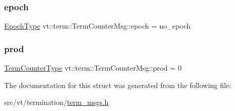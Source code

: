 \mbox{\label{structvt_1_1term_1_1_term_counter_msg_af523f9872306ba8ad1c4ad49694b3ee8}} 
\subsubsection{\texorpdfstring{epoch}{epoch}}
{\footnotesize\ttfamily \hyperlink{namespacevt_a81d11b28122d43bf9834577e4a06440f}{Epoch\+Type} vt\+::term\+::\+Term\+Counter\+Msg\+::epoch = no\+\_\+epoch}

\mbox{\label{structvt_1_1term_1_1_term_counter_msg_a4fd3f09a9e5a54865abbd76a95ea7067}} 
\subsubsection{\texorpdfstring{prod}{prod}}
{\footnotesize\ttfamily \hyperlink{namespacevt_1_1term_a4fd378cdb0c36683afc1b3399d685f7f}{Term\+Counter\+Type} vt\+::term\+::\+Term\+Counter\+Msg\+::prod = 0}



The documentation for this struct was generated from the following file\+:\begin{DoxyCompactItemize}
\item 
src/vt/termination/\hyperlink{term__msgs_8h}{term\+\_\+msgs.\+h}\end{DoxyCompactItemize}
